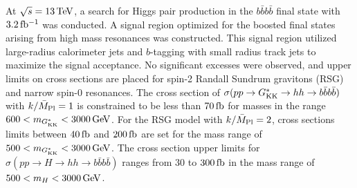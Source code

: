 At $\sqrt{s} = 13 \TeV$, a search for Higgs pair production in the $b\bar{b}b\bar{b}$ final state with $3.2\mbox{\,fb$^{-1}$}$ was conducted. A signal region optimized for the boosted final states arising from high mass resonances was constructed. This signal region utilized large-radius calorimeter jets and $b$-tagging with small radius track jets to maximize the signal acceptance. No significant excesses were observed, and upper limits on cross sections are placed for spin-2 Randall Sundrum gravitons (RSG) and narrow spin-0 resonances. The cross section of $\sigma(pp \to G^*_{\rm KK} \to hh \to b\bar{b}b\bar{b})$ with $k/\bar{M}_{\rm Pl}=1$ is constrained to be less than $70 \mbox{\,fb}$ for masses in the range $600 < m_{\Gkk} < 3000 \GeV$. For the RSG model with $k/\bar{M}_{\rm Pl}=2$, cross sections limits between $40\mbox{\,fb}$ and $200 \mbox{\,fb}$ are set for the mass range of $500 < m_{\Gkk} < 3000 \GeV$. The cross section upper limits for $\sigma(pp \to H \to hh \to b\bar{b}b\bar{b})$ ranges from $30$ to $300 \mbox{\,fb}$ in the mass range of $500 < m_{H} < 3000 \GeV$. 